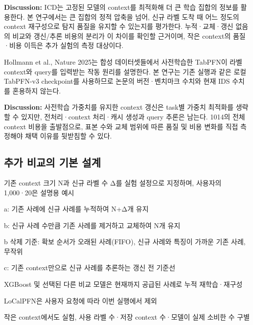 \textbf{Discussion:} ICD는 고정된 모델의 context를 최적화해 더 큰 학습 집합의 정보를 활용한다. 본 연구에서는 큰 집합의 정적 압축을 넘어, 신규 라벨 도착 때 어느 정도의 context 재구성으로 탐지 품질을 유지할 수 있는지를 평가한다. 누적·교체·갱신 없음의 비교와 갱신/\allowbreak{}추론 비용의 분리가 이 차이를 확인할 근거이며, 작은 context의 품질·비용 이득은 추가 실험의 측정 대상이다.

Hollmann et al., Nature 2025는 합성 데이터셋들에서 사전학습한 TabPFN이 라벨 context와 query를 입력받는 작동 원리를 설명한다. 본 연구는 기존 실행과 같은 로컬 TabPFN-v3 checkpoint를 사용하므로 논문의 버전·벤치마크 수치와 현재 IDS 수치를 혼용하지 않는다.

\textbf{Discussion:} 사전학습 가중치를 유지한 context 갱신은 task별 가중치 최적화를 생략할 수 있지만, 전처리·context 처리·캐시 생성과 query 추론은 남는다. 1014의 전체 context 비용을 출발점으로, 표본 수와 교체 범위에 따른 품질 및 비용 변화를 직접 측정해야 채택 이유를 뒷받침할 수 있다.

\subsection{추가 비교의 기본 설계}
\par\noindent \textbullet\enspace 기존 context 크기 N과 신규 라벨 수 Δ를 실험 설정으로 지정하며, 사용자의 1,000·20은 설명용 예시


\par\noindent \textbullet\enspace a: 기존 사례에 신규 사례를 누적하여 N+\allowbreak{}Δ개 유지


\par\noindent \textbullet\enspace b: 신규 사례 수만큼 기존 사례를 제거하고 교체하여 N개 유지


\par\noindent \textbullet\enspace b 삭제 기준: 확보 순서가 오래된 사례(FIFO), 신규 사례와 특징이 가까운 기존 사례, 무작위


\par\noindent \textbullet\enspace c: 기존 context만으로 신규 사례를 추론하는 갱신 전 기준선


\par\noindent \textbullet\enspace XGBoost 및 선택된 다른 비교 모델은 현재까지 공급된 사례로 누적 재학습·재구성


\par\noindent \textbullet\enspace LoCalPFN은 사용자 요청에 따라 이번 실행에서 제외


\par\noindent \textbullet\enspace 작은 context에서도 실험, 사용 라벨 수·저장 context 수·모델이 실제 소비한 수 구별


